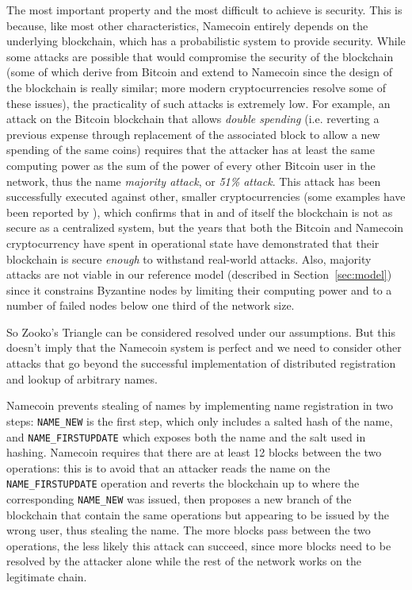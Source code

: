 \documentclass[mscthesis]{usiinfthesis}
\begin{document}
The most important property and the most difficult to achieve is security. This is because, like most other characteristics, Namecoin entirely depends on the underlying blockchain, which has a probabilistic system to provide security. While some attacks are possible that would compromise the security of the blockchain (some of which derive from Bitcoin and extend to Namecoin since the design of the blockchain is really similar; more modern cryptocurrencies resolve some of these issues), the practicality of such attacks is extremely low. For example, an attack on the Bitcoin blockchain that allows \emph{double spending} (i.e. reverting a previous expense through replacement of the associated block to allow a new spending of the same coins) requires that the attacker has at least the same computing power as the sum of the power of every other Bitcoin user in the network, thus the name \emph{majority attack}, or \emph{51\% attack}. This attack has been successfully executed against other, smaller cryptocurrencies (some examples have been reported by \cite{website:realwordmajorityattacks}), which confirms that in and of itself the blockchain is not as secure as a centralized system, but the years that both the Bitcoin and Namecoin cryptocurrency have spent in operational state have demonstrated that their blockchain is secure \emph{enough} to withstand real-world attacks. Also, majority attacks are not viable in our reference model (described in Section~\ref{sec:model}) since it constrains Byzantine nodes by limiting their computing power and to a number of failed nodes below one third of the network size.

So Zooko's Triangle can be considered resolved under our assumptions. But this doesn't imply that the Namecoin system is perfect and we need to consider other attacks that go beyond the successful implementation of distributed registration and lookup of arbitrary names.

Namecoin prevents stealing of names by implementing name registration in two steps: \texttt{NAME\_NEW} is the first step, which only includes a salted hash of the name, and \texttt{NAME\_FIRSTUPDATE} which exposes both the name and the salt used in hashing. Namecoin requires that there are at least 12 blocks between the two operations: this is to avoid that an attacker reads the name on the \texttt{NAME\_FIRSTUPDATE} operation and reverts the blockchain up to where the corresponding \texttt{NAME\_NEW} was issued, then proposes a new branch of the blockchain that contain the same operations but appearing to be issued by the wrong user, thus stealing the name. The more blocks pass between the two operations, the less likely this attack can succeed, since more blocks need to be resolved by the attacker alone while the rest of the network works on the legitimate chain.
\end{document}
